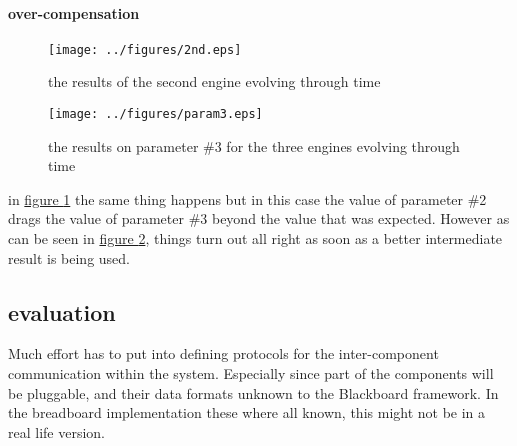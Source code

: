 \documentclass[]{lofar}
\begin{document}
      \paragraph{over-compensation}

        \begin{figure}
          \texttt{[image: ../figures/2nd.eps]}
          \hypertarget{fig:2nd}{}
          \caption{the results of the second engine evolving through time\label{fig:2nd}}
        \end{figure}

        \begin{figure}
          \texttt{[image: ../figures/param3.eps]}
          \hypertarget{fig:param3}{}%
          \caption{the results on parameter \#3 for the three engines evolving through time\label{fig:param3}}
        \end{figure}

        in \hyperlink{fig:2nd}{figure \ref{fig:2nd}} the same thing
        happens but in this case the value of parameter \#2 drags the
        value of parameter \#3 beyond the value that was
        expected. However as can be seen in
        \hyperlink{fig:param3}{figure \ref{fig:param3}}, things turn
        out all right as soon as a better intermediate result is being
        used.





    \subsection{evaluation}
    \label{subsec:evaluation}\hypertarget{subsec:evaluation}{}

      Much effort has to put into defining protocols for the
      inter-component communication within the system. Especially
      since part of the components will be pluggable, and their data
      formats unknown to the Blackboard framework. In the breadboard
      implementation these where all known, this might not be in a
      real life version.
\end{document}
